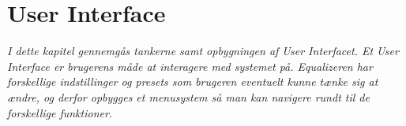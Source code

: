 \section{User Interface}\label{sec:ui}

\emph{I dette kapitel gennemgås tankerne samt opbygningen af User Interfacet. Et User Interface er brugerens måde at interagere med systemet på. Equalizeren har forskellige indstillinger og presets som brugeren eventuelt kunne tænke sig at ændre, og derfor opbygges et menusystem så man kan navigere rundt til de forskellige funktioner.}